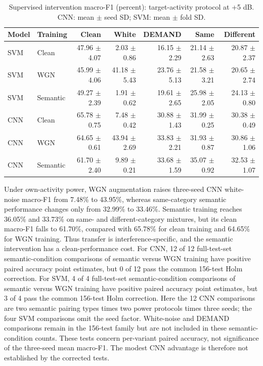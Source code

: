 \begin{table}[htbp]\centering\footnotesize
\caption{Supervised intervention macro-F1 (percent): target-activity protocol at +5 dB. CNN: mean $\pm$ seed SD; SVM: mean $\pm$ fold SD.}
\begin{tabular}{llrrrrr}\toprule Model & Training & Clean & White & DEMAND & Same & Different\\\midrule
SVM & Clean & 47.96 $\pm$ 4.07 & 2.03 $\pm$ 0.86 & 16.15 $\pm$ 2.29 & 21.14 $\pm$ 2.63 & 20.87 $\pm$ 2.37 \\
SVM & WGN & 45.99 $\pm$ 4.06 & 41.18 $\pm$ 5.43 & 23.76 $\pm$ 5.13 & 21.58 $\pm$ 3.21 & 20.65 $\pm$ 2.74 \\
SVM & Semantic & 49.27 $\pm$ 2.39 & 1.91 $\pm$ 0.62 & 19.61 $\pm$ 2.65 & 25.98 $\pm$ 2.05 & 24.13 $\pm$ 0.80 \\
\midrule
CNN & Clean & 65.78 $\pm$ 0.75 & 7.48 $\pm$ 0.42 & 30.88 $\pm$ 1.43 & 31.99 $\pm$ 0.25 & 30.38 $\pm$ 0.49 \\
CNN & WGN & 64.65 $\pm$ 0.61 & 43.94 $\pm$ 2.69 & 33.83 $\pm$ 2.21 & 31.93 $\pm$ 0.87 & 30.86 $\pm$ 1.06 \\
CNN & Semantic & 61.70 $\pm$ 2.40 & 9.89 $\pm$ 0.21 & 33.68 $\pm$ 1.59 & 35.07 $\pm$ 0.92 & 32.53 $\pm$ 1.07 \\
\bottomrule\end{tabular}\end{table}
Under own-activity power, WGN augmentation raises three-seed CNN white-noise macro-F1 from 7.48\% to 43.95\%, whereas same-category semantic performance changes only from 32.99\% to 33.46\%. Semantic training reaches 36.05\% and 33.73\% on same- and different-category mixtures, but its clean macro-F1 falls to 61.70\%, compared with 65.78\% for clean training and 64.65\% for WGN training. Thus transfer is interference-specific, and the semantic intervention has a clean-performance cost.
For CNN, 12 of 12 full-test-set semantic-condition comparisons of semantic versus WGN training have positive paired accuracy point estimates, but 0 of 12 pass the common 156-test Holm correction. For SVM, 4 of 4 full-test-set semantic-condition comparisons of semantic versus WGN training have positive paired accuracy point estimates, but 3 of 4 pass the common 156-test Holm correction. Here the 12 CNN comparisons are two semantic pairing types times two power protocols times three seeds; the four SVM comparisons omit the seed factor. White-noise and DEMAND comparisons remain in the 156-test family but are not included in these semantic-condition counts. These tests concern per-variant paired accuracy, not significance of the three-seed mean macro-F1. The modest CNN advantage is therefore not established by the corrected tests.

